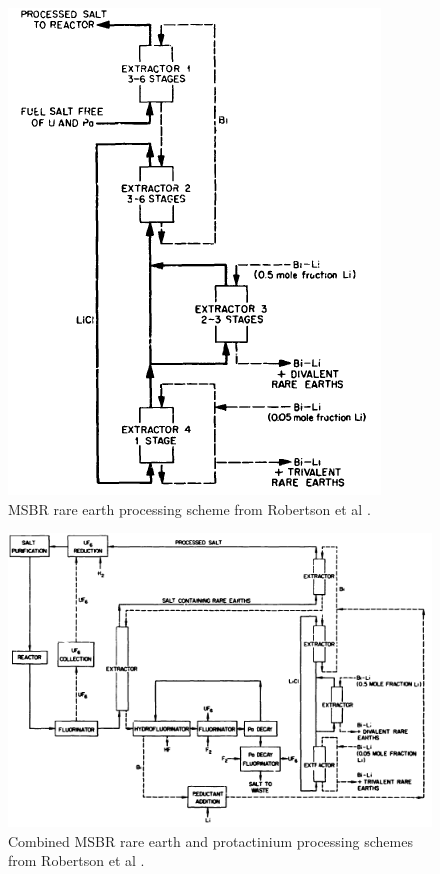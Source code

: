 \begin{figure}[H]
  \centering
  \includegraphics[scale=0.65]{images/msbr_re_robertson.PNG}
  \caption{MSBR rare earth processing scheme from Robertson et al \cite{robertson_conceptual_1971}.}
   \label{fig:msbr_re}
\end{figure}

\begin{figure}[H]
  \centering
  \includegraphics[scale=0.75]{images/msbr_flows_robertson.PNG}
  \caption{Combined MSBR rare earth and protactinium processing schemes from Robertson et al \cite{robertson_conceptual_1971}.}
   \label{fig:msbr_re_pa}
\end{figure}

